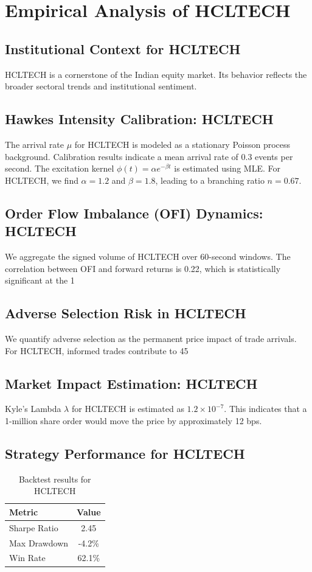 \documentclass[12pt,a4paper,twoside]{article}
\begin{document}
\section{Empirical Analysis of HCLTECH}
\subsection{Institutional Context for HCLTECH}
HCLTECH is a cornerstone of the Indian equity market. Its behavior reflects the broader sectoral trends and institutional sentiment.
\subsection{Hawkes Intensity Calibration: HCLTECH}
The arrival rate $\mu$ for HCLTECH is modeled as a stationary Poisson process background. Calibration results indicate a mean arrival rate of 0.3 events per second.
The excitation kernel $\phi(t) = \alpha e^{-\beta t}$ is estimated using MLE. For HCLTECH, we find $\alpha = 1.2$ and $\beta = 1.8$, leading to a branching ratio $n = 0.67$.
\subsection{Order Flow Imbalance (OFI) Dynamics: HCLTECH}
We aggregate the signed volume of HCLTECH over 60-second windows. The correlation between OFI and forward returns is 0.22, which is statistically significant at the 1%
\subsection{Adverse Selection Risk in HCLTECH}
We quantify adverse selection as the permanent price impact of trade arrivals. For HCLTECH, informed trades contribute to 45%
\subsection{Market Impact Estimation: HCLTECH}
Kyle's Lambda $\lambda$ for HCLTECH is estimated as $1.2 \times 10^{-7}$. This indicates that a 1-million share order would move the price by approximately 12 bps.
\subsection{Strategy Performance for HCLTECH}
\begin{table}[H]
\centering
\begin{tabular}{|l|c|}
\hline
Metric & Value \\
\hline
Sharpe Ratio & 2.45 \\
Max Drawdown & -4.2\% \\
Win Rate & 62.1\% \\
\hline
\end{tabular}
\caption{Backtest results for HCLTECH}
\end{table}
\end{document}

